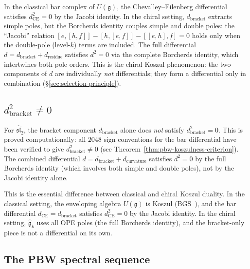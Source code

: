 \begin{remark}[Why \texorpdfstring{$d_{\mathrm{bracket}}^2 \neq 0$}{d\_bracket\textasciicircum 2 != 0}]
\label{rem:frame-why-dbracket-fails}
In the classical bar complex of $U(\mathfrak{g})$, the
Chevalley--Eilenberg differential satisfies
$d_{\mathrm{CE}}^2 = 0$ by the Jacobi identity.  In the chiral
setting, $d_{\mathrm{bracket}}$ extracts simple poles, but the
Borcherds identity couples simple and double poles:
the ``Jacobi'' relation $[e, [h, f]] - [h, [e, f]] - [[e,h], f] = 0$
holds only when the double-pole (level-$k$) terms are included.
The full differential $d = d_{\mathrm{bracket}} + d_{\mathrm{residue}}$
satisfies $d^2 = 0$ via the complete Borcherds identity, which
intertwines both pole orders.  This is the chiral Koszul phenomenon:
the two components of $d$ are individually \emph{not} differentials;
they form a differential only in combination
(\S\ref{sec:selection-principle}).
\end{remark}

\subsection{\texorpdfstring{$d_{\mathrm{bracket}}^2 \neq 0$}{d bracket squared is not zero}}

For $\widehat{\mathfrak{sl}}_2$, the bracket component
$d_{\mathrm{bracket}}$ alone does \emph{not} satisfy
$d_{\mathrm{bracket}}^2 = 0$.  This is proved computationally:
all $2048$ sign conventions for the bar differential have been
verified to give $d_{\mathrm{bracket}}^2 \neq 0$
(see Theorem~\ref{thm:pbw-koszulness-criterion}).
The combined differential $d = d_{\mathrm{bracket}}
+ d_{\mathrm{curvature}}$ satisfies $d^2 = 0$ by the full
Borcherds identity (which involves both simple and double poles),
not by the Jacobi identity alone.

This is the essential difference between classical and chiral
Koszul duality.  In the classical setting, the enveloping algebra
$U(\mathfrak{g})$ is Koszul (BGS~\cite{BGS96}), and the bar
differential $d_{\mathrm{CE}} = d_{\mathrm{bracket}}$ satisfies
$d_{\mathrm{CE}}^2 = 0$ by the Jacobi identity.  In the chiral
setting, $\widehat{\mathfrak{g}}_k$ uses all OPE poles (the full
Borcherds identity), and the bracket-only piece is not a
differential on its own.

\subsection{The PBW spectral sequence}

